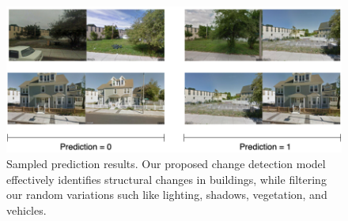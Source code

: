 \begin{figure}[ht!]
    \centering
    \includegraphics[width=1.0\linewidth]{figure/res_noise.png}
    \caption{Sampled prediction results. Our proposed change detection model effectively identifies structural changes in buildings, while filtering our random variations such like lighting, shadows, vegetation, and vehicles.}
    \label{fig:res_noisy}
\end{figure}


